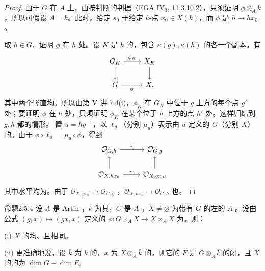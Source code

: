 \begin{proof}
由于 $G$ 在 $A$ 上，由按判断的判据（EGA IV$_3$, 11.3.10.2），只须证明 $\phi\otimes_A k$ ，所以可假设 $A=k$。此时，给定 $s_0$ 于给定 $k$-点 $x_0\in X(k)$，而 $\phi$ 是 $h\mapsto hx_0$。

取 $h\in G$，证明 $\phi$ 在 $h$ 处。设 $K$ 是 $k$ 的，包含 $\kappa(g),\kappa(h)$ 的各一个副本。有
\[
\begin{tikzcd}
G_K\arrow[r,"\phi_K"]\arrow[d]&X_K\arrow[d]\\
G\arrow[r,"\phi"']&X,
\end{tikzcd}
\]
其中两个竖直均。所以由第 V 讲 7.4(i)，$\phi_K$ 在 $G_K$ 中位于 $g$ 上方的每个点 $g'$ 处；要证明 $\phi$ 在 $h$ 处，只须证明 $\phi_K$ 在某个位于 $h$ 上方的点 $h'$ 处。这样归结到 $g,h$ 都的情形。
置 $u=hg^{-1}$，以 $\ell_u$（分别 $\mu_u$）表示由 $u$ 定义的 $G$（分别 $X$）的。由于 $\phi\circ\ell_u=\mu_u\circ\phi$，得到
\[
\begin{tikzcd}
\mathcal O_{G,h}\arrow[r,"\sim"]&\mathcal O_{G,g}\\
\mathcal O_{X,hx_0}\arrow[u]\arrow[r,"\sim"]&\mathcal O_{X,gx_0}\arrow[u],
\end{tikzcd}
\]
其中水平均为。由于 $\mathcal O_{X,gx_0}\to\mathcal O_{G,g}$ ，$\mathcal O_{X,hx_0}\to\mathcal O_{G,h}$ 也。
\end{proof}
\begin{SGAresult}{命题}{2.5.4}
设 $A$ 是 Artin ，$k$ 为其，$G$ 是 $A$-，$X\ne\varnothing$ 为带有 $G$ 的左的 $A$-。设由公式 $(g,x)\mapsto(gx,x)$ 定义的 $\phi:G\times_A X\to X\times_A X$ 为。则：

(i) $X$ 的均、且相同。

(ii) 更准确地说，设 $\overline k$ 为 $k$ 的，$x$ 为 $X\otimes_A\overline k$ 的，则它的 $F$ 是 $G\otimes_A\overline k$ 的闭，且 $X$ 的的为 $\dim G-\dim F$。
\end{SGAresult}
